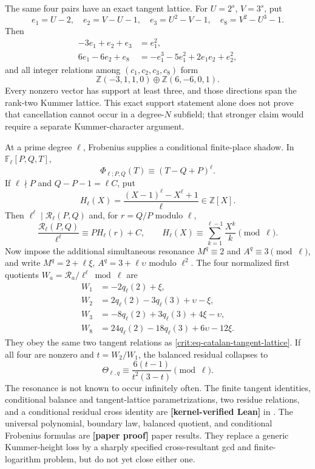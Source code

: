 \documentclass[11pt,oneside]{article}
\theoremstyle{definition}
\theoremstyle{remark}
\newcommand{\Z}{\mathbb Z}
\newcommand{\lean}[1]{\texttt{\detokenize{#1}}}
\newcommand{\statuslean}{\textcolor{leanblue}{\textbf{[kernel-verified Lean]}}}
\newcommand{\statusnew}{\textcolor{newgreen}{\textbf{[paper proof]}}}
\begin{document}
The same four pairs have an exact tangent lattice.  For $U=2^s$, $V=3^s$, put
\[
 e_1=U-2,\quad e_2=V-U-1,\quad
 e_3=U^2-V-1,\quad e_8=V^2-U^3-1.
\]
Then
\begin{align}
 -3e_1+e_2+e_3&=e_1^2,\nonumber\\
 6e_1-6e_2+e_8&=-e_1^3-5e_1^2+2e_1e_2+e_2^2,
 \label{crit:eq-catalan-tangent-identities}
\end{align}
and all integer relations among $(c_1,c_2,c_3,c_8)$ form
\begin{equation}
 \Z(-3,1,1,0)\oplus\Z(6,-6,0,1).
 \label{crit:eq-catalan-tangent-lattice}
\end{equation}
Every nonzero vector has support at least three, and those directions span the rank-two
Kummer lattice.  This exact support statement alone does not prove that cancellation cannot
occur in a degree-$N$ subfield; that stronger claim would require a separate
Kummer-character argument.

At a prime degree $\ell$, Frobenius supplies a conditional finite-place shadow.  In
$\mathbb F_\ell[P,Q,T]$,
\begin{equation}
 \Phi_{\ell;P,Q}(T)\equiv(T-Q+P)^\ell.
 \label{crit:eq-catalan-frobenius-collapse}
\end{equation}
If $\ell\nmid P$ and $Q-P-1=\ell C$, put
\[
 H_\ell(X)=\frac{(X-1)^\ell-X^\ell+1}{\ell}\in\Z[X].
\]
Then $\ell^\ell\mid\mathcal R_\ell(P,Q)$ and, for $r=Q/P$ modulo $\ell$,
\begin{equation}
 \frac{\mathcal R_\ell(P,Q)}{\ell^\ell}
 \equiv PH_\ell(r)+C,\qquad
 H_\ell(X)\equiv\sum_{k=1}^{\ell-1}\frac{X^k}{k}\pmod\ell.
 \label{crit:eq-catalan-first-frobenius}
\end{equation}
Now impose the additional simultaneous resonance
$M^q\equiv2$ and $A^q\equiv3\pmod\ell$, and write
$M^q=2+\ell\xi$, $A^q=3+\ell\upsilon$ modulo $\ell^2$.  The four normalized first
quotients $W_a=\mathcal R_a/\ell^\ell\bmod\ell$ are
\begin{align}
 W_1&=-2q_\ell(2)+\xi,\nonumber\\
 W_2&=2q_\ell(2)-3q_\ell(3)+\upsilon-\xi,\nonumber\\
 W_3&=-8q_\ell(2)+3q_\ell(3)+4\xi-\upsilon,\nonumber\\
 W_8&=24q_\ell(2)-18q_\ell(3)+6\upsilon-12\xi.
 \label{crit:eq-catalan-four-residues}
\end{align}
They obey the same two tangent relations as
\eqref{crit:eq-catalan-tangent-lattice}.  If all four are nonzero and
$t=W_2/W_1$, the balanced residual collapses to
\begin{equation}
 \Theta_{\ell,q}\equiv\frac{6(t-1)}{t^2(3-t)}\pmod\ell.
 \label{crit:eq-catalan-residual-map}
\end{equation}
The resonance is not known to occur infinitely often.  The finite tangent identities,
conditional balance and tangent-lattice parametrizations, two residue relations, and a
conditional residual cross identity are \statuslean{} in \lean{CatalanTangentCore}.  The
universal polynomial, boundary law,
balanced quotient, and conditional Frobenius formulas are \statusnew{} paper results.
They replace a generic Kummer-height loss by a sharply specified cross-resultant gcd and
finite-logarithm problem, but do not yet close either one.
\end{document}
